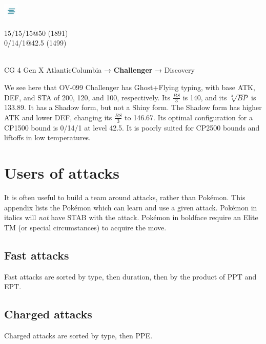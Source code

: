 \documentclass[ebook,10pt,openany,oneside]{memoir}
\begin{document}
\begin{speciesbox}[title=OV-099 Challenger,title style={left color=Flying,right color=Ghost},after title={\hfill 200 120 100 140.00 133.89}]
\begin{minipage}{0.3\linewidth}
\includegraphics[height=2em,keepaspectratio]{images/fog.png}
\end{minipage}
\begin{minipage}{0.7\linewidth}\raggedleft{}
\vfill{}
  15/15/15@50 (1891)\\
  0/14/1@42.5 (1499)
\end{minipage}\\
CG 4 Gen X Atlantic\hfill{}Columbia → \textbf{Challenger} → Discovery
\end{speciesbox}
\bigskip\noindent{}We see here that OV-099 Challenger has Ghost+Flying typing, with base ATK, DEF, and STA
of 200, 120, and 100, respectively. Its $\frac{BS}{3}$ is 140, and its $\sqrt[3]{BP}$ is 133.89.
It has a Shadow form, but not a Shiny form. The Shadow form has higher ATK and lower DEF, changing
its $\frac{BS}{3}$ to 146.67. Its optimal configuration for a CP1500 bound is 0/14/1 at level 42.5.
It is poorly suited for CP2500 bounds and liftoffs in low temperatures.
\clearpage


\chapter{Users of attacks\label{chap:attackemployers}}
It is often useful to build a team around attacks, rather than Pokémon.
This appendix lists the Pokémon which can learn and use a given attack.
Pokémon in italics will \textit{not} have STAB with the attack.
Pokémon in boldface require an Elite TM (or special circumstances) to acquire the move.
\section{Fast attacks\label{sec:usersfast}}
Fast attacks are sorted by type, then duration, then by the product of PPT and EPT\@.

\section{Charged attacks\label{sec:userscharged}}
Charged attacks are sorted by type, then PPE\@.

\backmatter

\end{document}
